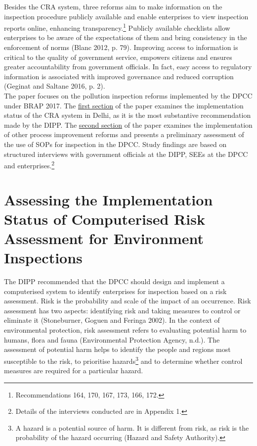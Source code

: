 \documentclass[a4paper, 12pt]{article}
\begin{document}
                 Besides the CRA system, three reforms aim to make information on the inspection procedure publicly available and enable enterprises to view inspection reports online, enhancing transparency.\footnote{Recommendations 164, 170, 167, 173, 166, 172.} Publicly available checklists allow enterprises to be aware of the expectations of them and bring consistency in the enforcement of norms (Blanc 2012, p. 79). Improving access to information is critical to the quality of government service, empowers citizens and ensures greater accountability from government officials. In fact, easy access to regulatory information is associated with improved governance and reduced corruption (Geginat and Saltane 2016, p. 2). \\
                 
                 The paper focuses on the pollution inspection reforms implemented by the DPCC under BRAP 2017. The \hyperref[sec:1]{first section} of the paper examines the implementation status of the CRA system in Delhi, as it is the most substantive recommendation made by the DIPP. The \hyperref[sec:2]{second section} of the paper examines the implementation of other process improvement reforms and presents a preliminary assessment of the use of SOPs for inspection in the DPCC. Study findings are based on structured interviews with government officials at the DIPP, SEEs at the DPCC and enterprises.\footnote{Details of the interviews conducted are in Appendix 1.} \\ %
                 
                 \section{Assessing the Implementation Status of Computerised Risk Assessment for Environment Inspections}\label{sec:1} 
                 
                 The DIPP recommended that the DPCC should design and implement a computerised system to identify enterprises for inspection based on a risk assessment. Risk is the probability and scale of the impact of an occurrence. Risk assessment has two aspects: identifying risk and taking measures to control or eliminate it (Stoneburner, Goguen and Feringa 2002). In the context of environmental protection, risk assessment refers to evaluating potential harm to humans, flora and fauna (Environmental Protection Agency, n.d.). The assessment of potential harm helps to identify the people and regions most susceptible to the risk, to prioritise hazards\footnote{A hazard is a potential source of harm. It is different from risk, as risk is the probability of the hazard occurring (Hazard and Safety Authority).} and to determine whether control measures are required for a particular hazard. \\
                 
\end{document}

